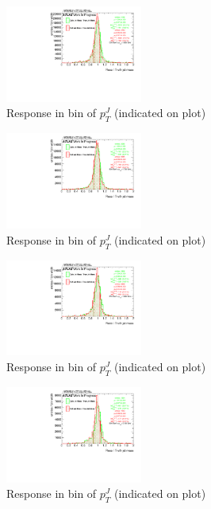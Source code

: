 %
\begin{figure}

\includegraphics[width=0.4\textwidth]{appendixB/mTASCOMB_Tops_calibmCal_030ro_20:20:52-03-11-2016/8ResponsePTJ_h_JetRatio_mJ07CALO.pdf}
\caption{Response in bin of  $p_{T}^{J}$ (indicated on plot)} 

\end{figure}


\begin{figure}

\includegraphics[width=0.4\textwidth]{appendixB/mTASCOMB_Tops_calibmCal_030ro_20:20:52-03-11-2016/8ResponsePTJ_h_JetRatio_mJ08CALO.pdf}
\caption{Response in bin of  $p_{T}^{J}$ (indicated on plot)} 

\end{figure}

\begin{figure}

\includegraphics[width=0.4\textwidth]{appendixB/mTASCOMB_Tops_calibmCal_030ro_20:20:52-03-11-2016/8ResponsePTJ_h_JetRatio_mJ09CALO.pdf}
\caption{Response in bin of  $p_{T}^{J}$ (indicated on plot)} 

\end{figure}

\begin{figure}

\includegraphics[width=0.4\textwidth]{appendixB/mTASCOMB_Tops_calibmCal_030ro_20:20:52-03-11-2016/8ResponsePTJ_h_JetRatio_mJ10CALO.pdf}
\caption{Response in bin of  $p_{T}^{J}$ (indicated on plot)} 

\end{figure}


